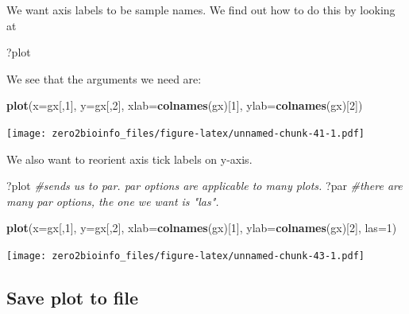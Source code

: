 \documentclass[]{article}
\newenvironment{Shaded}{\begin{snugshade}}{\end{snugshade}}
\newcommand{\KeywordTok}[1]{\textcolor[rgb]{0.13,0.29,0.53}{\textbf{#1}}}
\newcommand{\DataTypeTok}[1]{\textcolor[rgb]{0.13,0.29,0.53}{#1}}
\newcommand{\DecValTok}[1]{\textcolor[rgb]{0.00,0.00,0.81}{#1}}
\newcommand{\CommentTok}[1]{\textcolor[rgb]{0.56,0.35,0.01}{\textit{#1}}}
\newcommand{\NormalTok}[1]{#1}
\begin{document}
We want axis labels to be sample names. We find out how to do this by
looking at

\begin{Shaded}
\begin{Highlighting}[]
\NormalTok{?plot}
\end{Highlighting}
\end{Shaded}

We see that the arguments we need are:

\begin{Shaded}
\begin{Highlighting}[]
\KeywordTok{plot}\NormalTok{(}\DataTypeTok{x=}\NormalTok{gx[,}\DecValTok{1}\NormalTok{], }\DataTypeTok{y=}\NormalTok{gx[,}\DecValTok{2}\NormalTok{], }\DataTypeTok{xlab=}\KeywordTok{colnames}\NormalTok{(gx)[}\DecValTok{1}\NormalTok{], }\DataTypeTok{ylab=}\KeywordTok{colnames}\NormalTok{(gx)[}\DecValTok{2}\NormalTok{])}
\end{Highlighting}
\end{Shaded}

\texttt{[image: zero2bioinfo\_files/figure-latex/unnamed-chunk-41-1.pdf]}

We also want to reorient axis tick labels on y-axis.

\begin{Shaded}
\begin{Highlighting}[]
\NormalTok{?plot }\CommentTok{#sends us to par. par options are applicable to many plots.}
\NormalTok{?par }\CommentTok{#there are many par options, the one we want is "las".}
\end{Highlighting}
\end{Shaded}

\begin{Shaded}
\begin{Highlighting}[]
\KeywordTok{plot}\NormalTok{(}\DataTypeTok{x=}\NormalTok{gx[,}\DecValTok{1}\NormalTok{], }\DataTypeTok{y=}\NormalTok{gx[,}\DecValTok{2}\NormalTok{], }\DataTypeTok{xlab=}\KeywordTok{colnames}\NormalTok{(gx)[}\DecValTok{1}\NormalTok{], }\DataTypeTok{ylab=}\KeywordTok{colnames}\NormalTok{(gx)[}\DecValTok{2}\NormalTok{], }\DataTypeTok{las=}\DecValTok{1}\NormalTok{)}
\end{Highlighting}
\end{Shaded}

\texttt{[image: zero2bioinfo\_files/figure-latex/unnamed-chunk-43-1.pdf]}

\subsection{Save plot to file}\label{save-plot-to-file}
\end{document}
